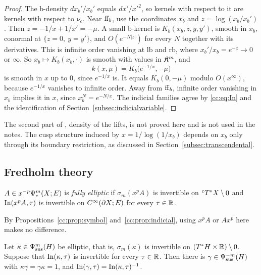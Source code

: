 \begin{proof}
The b-density \(dx_b'/x_b'\) equals \(dx'/x'^2\), so kernels with respect
to it are kernels with respect to \(\nu_c\). Near \(\mathrm{ff}_b\), use the
coordinates \(x_b\) and \(z=\log(x_b/x_b')\). Then \(z=-1/x+1/x'=-\mu\).
A small b-kernel is \(K_b(x_b,z,y,y')\), smooth in \(x_b\), conormal at
\(\{z=0,\ y=y'\}\), and \(O(e^{-N|z|})\) for every \(N\) together with its
derivatives. This is infinite order vanishing at \(\mathrm{lb}\) and
\(\mathrm{rb}\), where \(x_b'/x_b=e^{-z}\to0\) or \(\infty\). So
\(x_b\mapsto K_b(x_b,\cdot)\) is smooth with values in \(\mathfrak K^m\), and
\[
 k(x,\mu)=K_b\bigl(e^{-1/x},-\mu\bigr)
\]
is smooth in \(x\) up to \(0\), since \(e^{-1/x}\) is. It equals
\(K_b(0,-\mu)\) modulo \(O(x^\infty)\), because \(e^{-1/x}\) vanishes to
infinite order. Away from \(\mathrm{ff}_b\), infinite order vanishing in \(x_b\)
implies it in \(x\), since \(x_b^N=e^{-N/x}\). The indicial families agree
by \eqref{cc:eq:In} and the identification of
Section~\ref{subsec:indicialvariable}.
\end{proof}

\begin{remark}\label{cc:rem:density}
The second part of \cite[Prop.~26]{MN}, density of the lifts, is not
proved here and is not used in the notes. The cusp structure induced by
\(x=1/\log(1/x_b)\) depends on \(x_b\) only through its boundary
restriction, as discussed in Section~\ref{subsec:transcendental}.
\end{remark}

\subsection{Fredholm theory}\label{cc:subsec:fredholm}

\begin{definition}\label{cc:def:fullyelliptic}
\(A\in x^{-p}\Psi_{c}^m(X;E)\) is \emph{fully elliptic} if
\(\sigma_m(x^pA)\) is invertible on \({}^cT^*X\setminus0\) and
\(\operatorname{In}(x^pA,\tau)\) is invertible on \(C^\infty(\partial X;E)\) for every
\(\tau\in\mathbb R\).
\end{definition}

By Propositions~\ref{cc:prop:symbol} and~\ref{cc:prop:indicial}, using
\(x^pA\) or \(Ax^p\) here makes no difference.

\begin{lemma}\label{cc:lem:susinv}
Let \(\kappa\in\Psi_{\mathrm{sus}}^m(H)\) be elliptic, that is, \(\sigma_m(\kappa)\) is
invertible on \((T^*H\times\mathbb R)\setminus0\). Suppose that
\(\operatorname{In}(\kappa,\tau)\) is invertible for every \(\tau\in\mathbb R\). Then there is
\(\gamma\in\Psi_{\mathrm{sus}}^{-m}(H)\) with \(\kappa\gamma=\gamma\kappa=1\), and
\(\operatorname{In}(\gamma,\tau)=\operatorname{In}(\kappa,\tau)^{-1}\).
\end{lemma}

